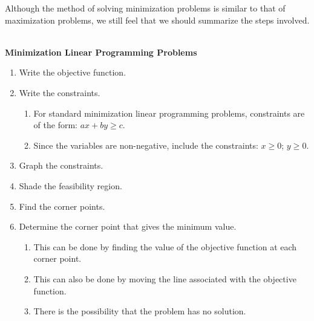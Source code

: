 Although the method of solving minimization problems is similar to that of maximization problems, we still feel that we should summarize the steps involved.
\begin{summarybox}
    ~\\
    \textbf{Minimization Linear Programming Problems}
    \begin{enumerate}
        \item Write the objective function.
        \item Write the constraints.
              \begin{enumerate}
                  \item For standard minimization linear programming problems, constraints are of the form: \(ax + by \geq c\).
                  \item Since the variables are non-negative, include the constraints: \(x \geq 0\); \(y \geq 0\).
              \end{enumerate}
        \item Graph the constraints.
        \item Shade the feasibility region.
        \item Find the corner points.
        \item Determine the corner point that gives the minimum value.
              \begin{enumerate}
                  \item This can be done by finding the value of the objective function at each corner point.
                  \item This can also be done by moving the line associated with the objective function.
                  \item There is the possibility that the problem has no solution.
              \end{enumerate}
    \end{enumerate}
\end{summarybox}
